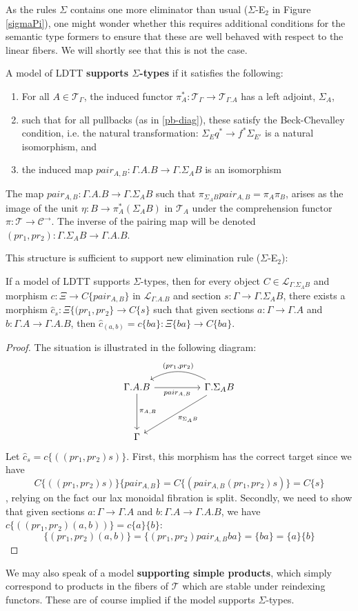 As the rules $\Sigma$ contains one more eliminator than usual ($\Sigma$-E$_2$ in Figure \ref{sigmaPi}), one might wonder whether this requires additional conditions for the semantic type formers to ensure that these are well behaved with respect to the linear fibers. We will shortly see that this is not the case.
\begin{defn}A model of LDTT \textbf{supports $\Sigma$-types} if it satisfies the following:
  \begin{enumerate}
  \item For all $A \in \mathcal{T}_{\Gamma}$, the induced functor $\pi_A^* : \mathcal{T}_{\Gamma} \to \mathcal{T}_{\Gamma.A}$ has a left adjoint, $\Sigma_A$,
  \item such that for all pullbacks (as in \ref{pb-diag}), these satisfy the Beck-Chevalley condition, i.e. the natural transformation: $\Sigma_Eq^* \to f^*\Sigma_{E'}$ is a natural isomorphism, and
  \item the induced map $pair_{A,B} : \Gamma.A.B \to \Gamma.\Sigma_AB$ is an isomorphism
  \end{enumerate}
\end{defn}
The map $pair_{A, B} : \Gamma.A.B \to \Gamma.\Sigma_AB$ such that $\pi_{\Sigma_AB}pair_{A,B} = \pi_A\pi_B$, arises as the image of the unit $\eta : B \to \pi_A^*(\Sigma_AB)$ in $\mathcal{T}_A$ under the comprehension functor $\pi : \mathcal{T} \to \mathcal{C}^{\to}$. The inverse of the pairing map will be denoted $(pr_1, pr_2) : \Gamma.\Sigma_AB \to \Gamma.A.B$.


This structure is sufficient to support new elimination rule ($\Sigma$-E$_2$):
\begin{thm}
If a model of LDTT supports $\Sigma$-types, then for every object $C \in \mathcal{L}_{\Gamma.\Sigma_AB}$ and morphism $c : \Xi \to C\{pair_{A,B}\}$ in $\mathcal{L}_{\Gamma.A.B}$ and section $s : \Gamma \to \Gamma.\Sigma_AB$, there exists a morphism $\hat c_s : \Xi\{(pr_1, pr_2\} \to C\{s\}$ such that given sections $a : \Gamma \to \Gamma.A$ and $b : \Gamma.A \to \Gamma.A.B$, then $\hat c_{(a, b)} = c\{ba\} : \Xi\{ba\} \to C\{ba\}$.
\begin{proof}
  The situation is illustrated in the following diagram:
    \[
      \ti
      \Gamma.A.B \ar[d, "\pi_{A,B}"] \ar[r,"pair_{A,B}",swap] & \Gamma.\Sigma_AB \ar[l,"{(pr_1, pr_2)}",bend right,swap] \ar[dl, "\pi_{\Sigma_AB}"]\\
      \Gamma &
      \kz
    \]
Let $\hat c_s = c\{((pr_1, pr_2)s)\}$. First, this morphism has the correct target since we have
    \[
      C\{((pr_1,pr_2)s)\}\{pair_{A,B}\} = C\{(pair_{A,B}(pr_1,pr_2)s)\} = C\{s\}
    \]
    , relying on the fact our lax monoidal fibration is split. Secondly, we need to show that given sections $a : \Gamma \to \Gamma.A$ and $b : \Gamma.A \to \Gamma.A.B$, we have $c\{((pr_1,pr_2)(a, b))\} = c\{a\}\{b\}$:
    \[
      \{(pr_1,pr_2)(a, b)\} = \{(pr_1,pr_2)pair_{A,B}ba\} = \{ba\} = \{a\}\{b\}
    \]
  \end{proof}
\end{thm}
We may also speak of a model \textbf{supporting simple products}, which simply correspond to products in the fibers of $\mathcal{T}$ which are stable under reindexing functors. These are of course implied if the model supports $\Sigma$-types.
